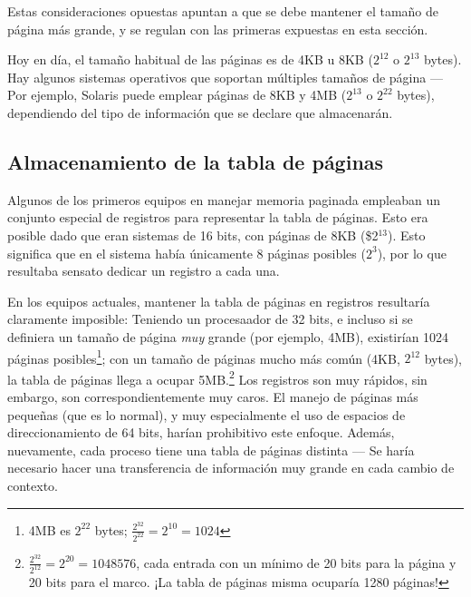 \documentclass[11pt,fleqn]{book} %
\begin{document}
Estas consideraciones opuestas apuntan a que se debe mantener el
tamaño de página más grande, y se regulan con las primeras expuestas
en esta sección.

Hoy en día, el tamaño habitual de las páginas es de 4KB u 8KB
($2^{12}$ o $2^{13}$ bytes). Hay algunos sistemas operativos que
soportan múltiples tamaños de página — Por ejemplo, Solaris puede
emplear páginas de 8KB y 4MB ($2^{13}$ o $2^{22}$ bytes), dependiendo
del tipo de información que se declare que almacenarán.
\subsection{Almacenamiento de la tabla de páginas}
\label{sec-5-4-2}


Algunos de los primeros equipos en manejar memoria paginada empleaban
un conjunto especial de registros para representar la tabla de
páginas. Esto era posible dado que eran sistemas de 16 bits, con
páginas de 8KB (\$2$^{\mathrm{13}}$). Esto significa que en el sistema había
únicamente 8 páginas posibles ($2^3$), por lo que resultaba sensato
dedicar un registro a cada una.

En los equipos actuales, mantener la tabla de páginas en registros
resultaría claramente imposible: Teniendo un procesaador de 32 bits, e
incluso si se definiera un tamaño de página \emph{muy} grande (por ejemplo,
4MB), existirían 1024 páginas posibles\footnote{4MB es $2^{22}$ bytes;
$\frac{2^{32}}{2^{22}} = 2^{10} = 1024$ }; con un tamaño de páginas
mucho más común (4KB, $2^{12}$ bytes), la tabla de páginas llega a
ocupar 5MB.\footnote{$\frac{2^{32}}{2^{12}} = 2^{20} = 1048576$, cada
entrada con un mínimo de 20 bits para la página y 20 bits para el
marco. ¡La tabla de páginas misma ocuparía 1280 páginas! } Los
registros son muy rápidos, sin embargo, son correspondientemente muy
caros. El manejo de páginas más pequeñas (que es lo normal), y muy
especialmente el uso de espacios de direccionamiento de 64 bits,
harían prohibitivo este enfoque. Además, nuevamente, cada proceso
tiene una tabla de páginas distinta — Se haría necesario hacer una
transferencia de información muy grande en cada cambio de contexto.
\end{document}

